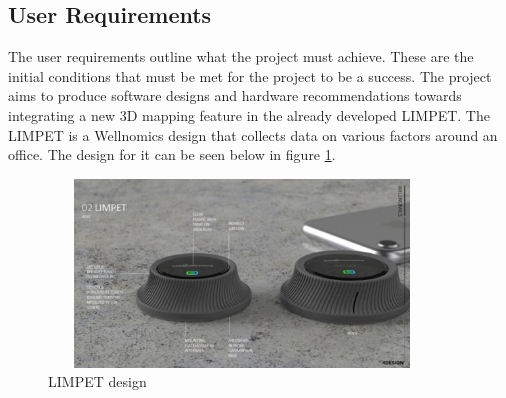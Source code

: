 \subsection{User Requirements}

The user requirements outline what the project must achieve. These are the initial conditions that must be met for the project to be a success. The project aims to produce software designs and hardware recommendations towards integrating a new 3D mapping feature in the already developed LIMPET. The LIMPET is a Wellnomics design that collects data on various factors around an office. The design for it can be seen below in figure \ref{fig:limpet}. \\

\begin{figure}[H]
\centering
\noindent\includegraphics[width=10.26cm,height=5cm]{./images/limpet.png}
\caption{LIMPET design}
\label{fig:limpet}
\end{figure}

